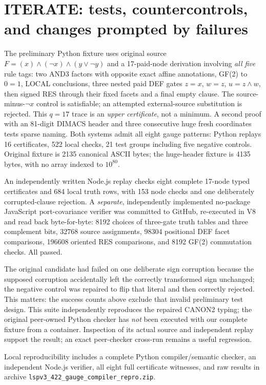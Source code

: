 \documentclass[11pt]{article}
\begin{document}
\section*{ITERATE: tests, countercontrols, and changes prompted by failures}
The preliminary Python fixture uses original source
\(F=(x)\land(\neg x)\land(y\lor\neg y)\) and a 17-paid-node
derivation involving \emph{all five} rule tags: two AND3 factors
with opposite exact affine annotations, GF(2) to \(0=1\),
LOCAL conclusions, three nested paid DEF gates
\(z=x\), \(w=z\), \(u=z\wedge w\), then signed RES through their
fixed facets and a final empty clause. The source-minus-\(\neg x\)
control is satisfiable; an attempted external-source substitution
is rejected. This \(q=17\) trace is an \emph{upper certificate}, not
a minimum. A second proof with an 81-digit DIMACS header and three
consecutive huge fresh coordinates tests sparse naming. Both
systems admit all eight gauge patterns: Python replays 16 certificates,
522 local checks, 21 test groups including five negative controls.
Original fixture is 2135 canonical ASCII bytes; the huge-header
fixture is 4135 bytes, with no array indexed to \(10^{80}\).

An independently written Node.js replay checks eight complete
17-node typed certificates and 684 local truth rows, with 153
node checks and one deliberately corrupted-clause rejection.
A \emph{separate}, independently implemented no-package
JavaScript port-covariance verifier was committed to GitHub,
re-executed in V8 and read back byte-for-byte: 8192 choices of
three-gate truth tables and three complement bits,
32768 source assignments, 98304 positional DEF facet
comparisons, 196608 oriented RES comparisons, and
8192 GF(2) commutation checks. All passed.

The original candidate had failed on one deliberate sign corruption
because the supposed corruption accidentally left the correctly
transformed sign unchanged; the negative control was repaired to
flip that literal and then correctly rejected. This matters: the
success counts above exclude that invalid preliminary test design.
This suite independently reproduces the repaired CANON2 typing;
the original peer-owned Python checker has \emph{not} been executed
with our complete fixture from a container. Inspection of its actual
source and independent replay support the result; an exact
peer-checker cross-run remains a useful regression.

Local reproducibility includes a complete Python compiler/semantic
checker, an independent Node.js verifier, all eight full certificate
witnesses, and raw results in archive
\texttt{lspv3\_422\_gauge\_compiler\_repro.zip}.
\end{document}
